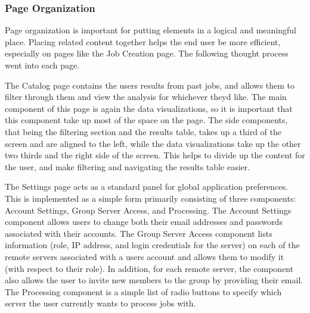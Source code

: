 \subsubsection{Page Organization}
Page organization is important for putting elements in a logical and meaningful place. Placing related content together helps the end user be more efficient, especially on pages like the Job Creation page. The following thought process went into each page.\par
The Catalog page contains the user\textquotesingle s results from past jobs, and allows them to filter through them and view the analysis for whichever they\textquotesingle d like. The main component of this page is again the data visualizations, so it is important that this component take up most of the space on the page. The side components, that being the filtering section and the results table, takes up a third of the screen and are aligned to the left, while the data visualizations take up the other two thirds and the right side of the screen. This helps to divide up the content for the user, and make filtering and navigating the results table easier.\par
The Settings page acts as a standard panel for global application preferences. This is implemented as a simple form primarily consisting of three components: Account Settings, Group Server Access, and Processing. The Account Settings component allows users to change both their email addresses and passwords associated with their accounts. The Group Server Access component lists information (role, IP address, and login credentials for the server) on each of the remote servers associated with a user\textquotesingle s account and allows them to modify it (with respect to their role). In addition, for each remote server, the component also allows the user to invite new members to the group by providing their email. The Processing component is a simple list of radio buttons to specify which server the user currently wants to process jobs with.\par

